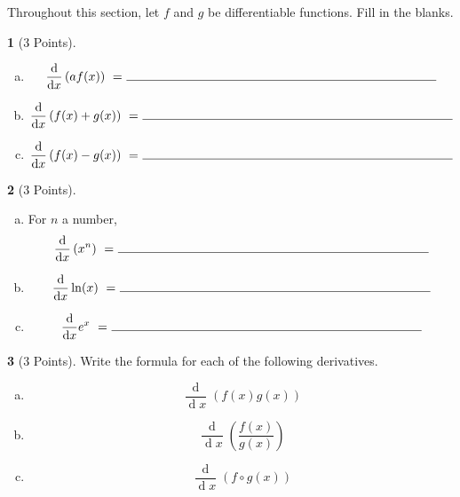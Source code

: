 \documentclass[12pt]{amsart}
\theoremstyle{definition}
\newtheorem{thm}{}
\theoremstyle{definition}
\newcommand{\ddx}[1]{\frac{\operatorname{d}}{\operatorname{d}\!#1}}
\begin{document}
Throughout this section, let $f$ and $g$ be differentiable functions.
Fill in the blanks.
\begin{thm}[3 Points]
  \begin{enumerate}[(a)]
    Let $a$ be a constant.
  \item
    \vspace{.05in}
    $$\ddx{x}\left(a f(x)\right)\ =\ \line(1,0){250}$$
    \vspace{.05in}
  \item
    \vspace{.05in}
    $$\ddx{x}\left(f(x) + g(x)\right)\ =\ \line(1,0){250}$$ 
    \vspace{.05in}
  \item
    \vspace{.05in}
    $$\ddx{x}\left(f(x) - g(x)\right)\ =\ \line(1,0){250}$$ 
  \end{enumerate}
\end{thm}

\vspace{.5in}

\begin{thm}[3 Points]
  \begin{enumerate}[(a)]
  \item
    For $n$ a number,
    \vspace{.05in}
    $$\ddx{x}\left(x^n\right)\ =\ \line(1,0){250}$$
    \vspace{.05in}
  \item
    \vspace{.05in}
    $$\ddx{x}\ln(x)\ =\ \line(1,0){250}$$
    \vspace{.05in}
  \item
    \vspace{.05in}
    $$\ddx{x}e^x\ =\ \line(1,0){250}$$
    \vspace{.05in}
  \end{enumerate}
\end{thm}

\newpage

\begin{thm}[3 Points]
  Write the formula for each of the following derivatives.
  \vspace{.05in}
  \begin{enumerate}[(a)]
  \item
    $$\ddx{x}\left(f(x)g(x)\right)$$
    \vspace{2in}
  \item
    $$\ddx{x}\left(\frac{f(x)}{g(x)}\right)$$
    \vspace{2in}
  \item
    $$\ddx{x}\left(f \circ g(x)\right)$$    
  \end{enumerate}
\end{thm}
\end{document}
